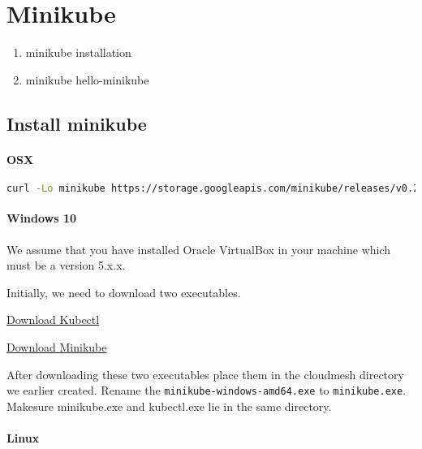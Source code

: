 \section{Minikube}

\begin{enumerate}
\item minikube installation
\item minikube hello-minikube
\end{enumerate}

\subsection{Install minikube}

\paragraph{OSX}\label{osx}

\begin{lstlisting}[language=bash]
curl -Lo minikube https://storage.googleapis.com/minikube/releases/v0.25.0/minikube-darwin-amd64 && chmod +x minikube && sudo mv minikube /usr/local/bin/
\end{lstlisting}

\paragraph{Windows 10}\label{windows-10}

We assume that you have installed Oracle VirtualBox in your machine
which must be a version 5.x.x.

Initially, we need to download two executables.

\href{http://storage.googleapis.com/kubernetes-release/release/v1.4.0/bin/windows/amd64/kubectl.exe}{Download
Kubectl}

\href{https://storage.googleapis.com/minikube/releases/v0.25.0/minikube-windows-amd64.exe}{Download
Minikube}

After downloading these two executables place them in the cloudmesh
directory we earlier created. Rename the \verb|minikube-windows-amd64.exe|
to \verb|minikube.exe|. Makesure minikube.exe and kubectl.exe lie in the
same directory.

\paragraph{Linux}\label{linux}


